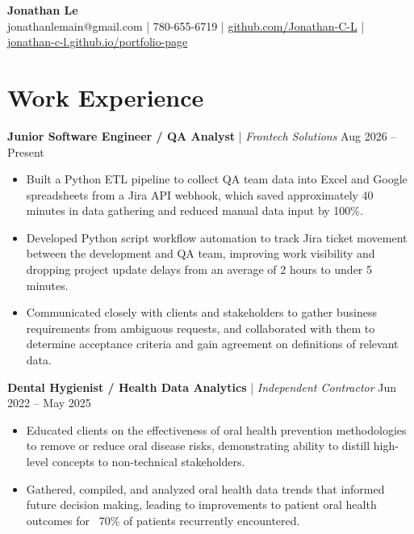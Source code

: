\documentclass[11pt, letterpaper]{article}
\begin{document}
\begin{center}
    {\LARGE \textbf{Jonathan Le}} \\[4pt]
    jonathanlemain@gmail.com |
    780-655-6719 |
    \href{https://github.com/Jonathan-C-L}{github.com/Jonathan-C-L} |
    \href{https://jonathan-c-l.github.io/portfolio-page}{jonathan-c-l.github.io/portfolio-page}
\end{center}

\section{Work Experience}

\textbf{Junior Software Engineer / QA Analyst} | \textit{Frontech Solutions} \hfill Aug 2026 -- Present
\begin{itemize}
    \item Built a Python ETL pipeline to collect QA team data into Excel and Google spreadsheets from a Jira API webhook, which saved approximately 40 minutes in data gathering and reduced manual data input by 100\%.
    \item Developed Python script workflow automation to track Jira ticket movement between the development and QA team, improving work visibility and dropping project update delays from an average of 2 hours to under 5 minutes.
    \item Communicated closely with clients and stakeholders to gather business requirements from ambiguous requests, and collaborated with them to determine acceptance criteria and gain agreement on definitions of relevant data.  
\end{itemize}

\textbf{Dental Hygienist / Health Data Analytics} | \textit{Independent Contractor} \hfill Jun 2022 -- May 2025
\begin{itemize}
    \item Educated clients on the effectiveness of oral health prevention methodologies to remove or reduce oral disease risks, demonstrating ability to distill high-level concepts to non-technical stakeholders.
    \item Gathered, compiled, and analyzed oral health data trends that informed future decision making, leading to improvements to patient oral health outcomes for ~70\% of patients recurrently encountered. 
\end{itemize}
\end{document}
